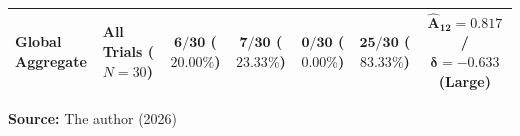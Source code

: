 \begin{table}[htbp]
{\begin{tabular}{llccccc}
        \midrule
        \textbf{Global Aggregate} & \textbf{All Trials ($N=30$)} & $\mathbf{6/30}$ ($\mathbf{20.00\%}$) & $\mathbf{7/30}$ ($\mathbf{23.33\%}$) & $\mathbf{0/30}$ ($\mathbf{0.00\%}$) & $\mathbf{25/30}$ ($\mathbf{83.33\%}$) & $\mathbf{\hat{A}_{12} = 0.817}$ / $\mathbf{\delta = -0.633}$ (\textbf{Large}) \\
        \bottomrule
    \end{tabular}}
    \par\medskip\ABNTEXfontereduzida\selectfont\textbf{Source:} The author (2026) \par\medskip
\end{table}
